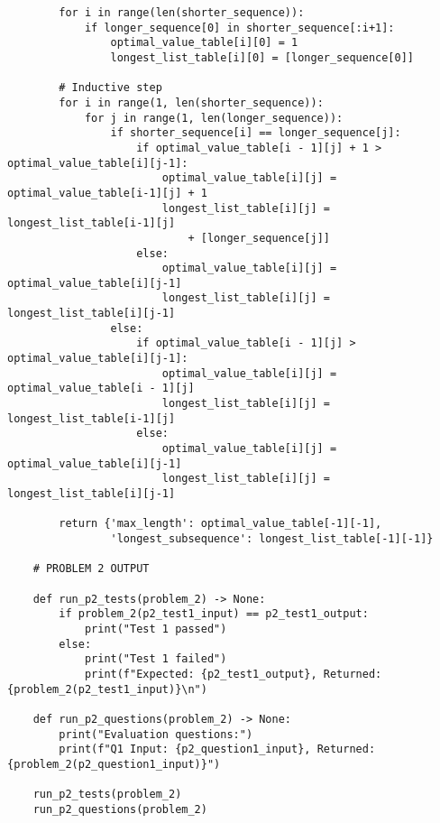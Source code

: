 \documentclass[12pt]{article}
\begin{document}
\begin{verbatim}
        for i in range(len(shorter_sequence)):
            if longer_sequence[0] in shorter_sequence[:i+1]:
                optimal_value_table[i][0] = 1
                longest_list_table[i][0] = [longer_sequence[0]]

        # Inductive step
        for i in range(1, len(shorter_sequence)):
            for j in range(1, len(longer_sequence)):
                if shorter_sequence[i] == longer_sequence[j]:
                    if optimal_value_table[i - 1][j] + 1 > optimal_value_table[i][j-1]:
                        optimal_value_table[i][j] = optimal_value_table[i-1][j] + 1
                        longest_list_table[i][j] = longest_list_table[i-1][j] 
                            + [longer_sequence[j]]
                    else:
                        optimal_value_table[i][j] = optimal_value_table[i][j-1]
                        longest_list_table[i][j] = longest_list_table[i][j-1]
                else:
                    if optimal_value_table[i - 1][j] > optimal_value_table[i][j-1]:
                        optimal_value_table[i][j] = optimal_value_table[i - 1][j]
                        longest_list_table[i][j] = longest_list_table[i-1][j]
                    else:
                        optimal_value_table[i][j] = optimal_value_table[i][j-1]
                        longest_list_table[i][j] = longest_list_table[i][j-1]

        return {'max_length': optimal_value_table[-1][-1],  
                'longest_subsequence': longest_list_table[-1][-1]}
        
    # PROBLEM 2 OUTPUT

    def run_p2_tests(problem_2) -> None:
        if problem_2(p2_test1_input) == p2_test1_output:
            print("Test 1 passed")
        else:
            print("Test 1 failed")
            print(f"Expected: {p2_test1_output}, Returned: {problem_2(p2_test1_input)}\n")

    def run_p2_questions(problem_2) -> None:
        print("Evaluation questions:")
        print(f"Q1 Input: {p2_question1_input}, Returned: {problem_2(p2_question1_input)}")

    run_p2_tests(problem_2)
    run_p2_questions(problem_2)
\end{verbatim}
\end{document}
